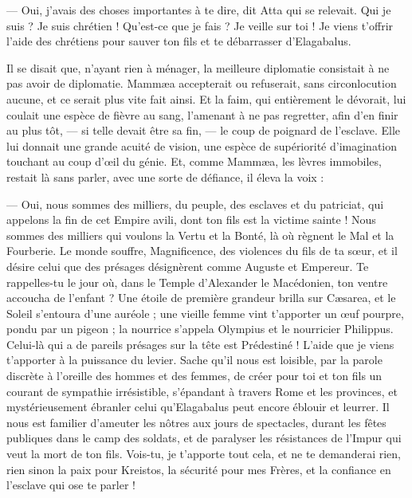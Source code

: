 \documentclass[a4paper, 11pt, oneside, polutonikogreek, french]{article}
\begin{document}
--- Oui, j'avais des choses importantes à te dire, dit Atta qui se relevait. Qui je suis ? Je suis chrétien ! Qu'est-ce que je fais ? Je veille sur toi ! Je viens t'offrir l'aide des chrétiens pour sauver ton fils et te débarrasser d'Elagabalus.

Il se disait que, n'ayant rien à ménager, la meilleure diplomatie consistait à ne pas avoir de diplomatie. Mammæa accepterait ou refuserait, sans circonlocution aucune, et ce serait plus vite fait ainsi. Et la faim, qui entièrement le dévorait, lui coulait une espèce de fièvre au sang, l'amenant à ne pas regretter, afin d'en finir au plus tôt, --- si telle devait être sa fin, --- le coup de poignard de l'esclave. Elle lui donnait une grande acuité de vision, une espèce de supériorité d'imagination touchant au coup d'œil du génie. Et, comme Mammæa, les lèvres immobiles, restait là sans parler, avec une sorte de défiance, il éleva la voix :

--- Oui, nous sommes des milliers, du peuple, des esclaves et du patriciat, qui appelons la fin de cet Empire avili, dont ton fils est la victime sainte ! Nous sommes des milliers qui voulons la Vertu et la Bonté, là où règnent le Mal et la Fourberie. Le monde souffre, Magnificence, des violences du fils de ta sœur, et il désire celui que des présages désignèrent comme Auguste et Empereur. Te rappelles-tu le jour où, dans le Temple d'Alexander le Macédonien, ton ventre accoucha de l’enfant ? Une étoile de première grandeur brilla sur Cæsarea, et le Soleil s'entoura d'une auréole ; une vieille femme vint t'apporter un œuf pourpre, pondu par un pigeon ; la nourrice s'appela Olympius et le nourricier Philippus. Celui-là qui a de pareils présages sur la tête est Prédestiné ! L'aide que je viens t'apporter à la puissance du levier. Sache qu'il nous est loisible, par la parole discrète à l'oreille des hommes et des femmes, de créer pour toi et ton fils un courant de sympathie irrésistible, s'épandant à travers Rome et les provinces, et mystérieusement ébranler celui qu'Elagabalus peut encore éblouir et leurrer. Il nous est familier d'ameuter les nôtres aux jours de spectacles, durant les fêtes publiques dans le camp des soldats, et de paralyser les résistances de l'Impur qui veut la mort de ton fils. Vois-tu, je t'apporte tout cela, et ne te demanderai rien, rien sinon la paix pour Kreistos, la sécurité pour mes Frères, et la confiance en l'esclave qui ose te parler !
\end{document}
